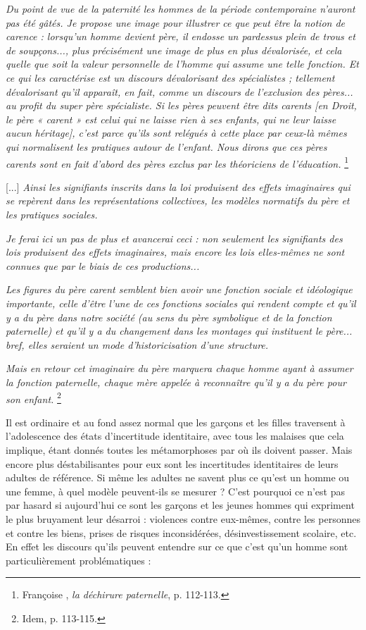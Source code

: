 \begin{displayquote} 
\emph{Du point de vue de la paternité les hommes de la période contemporaine n'auront pas été gâtés. Je propose une image pour illustrer ce que peut être la notion de carence : lorsqu'un homme devient père, il endosse un pardessus plein de trous et de soupçons..., plus précisément une image de plus en plus dévalorisée, et cela quelle que soit la valeur personnelle de l'homme qui assume une telle fonction. Et ce qui les caractérise est un discours dévalorisant des spécialistes ; tellement dévalorisant qu'il apparaît, en fait, comme un discours de l'exclusion des pères... au profit du super père spécialiste. Si les pères peuvent être dits carents \emph{[en Droit, le père « carent » est celui qui ne laisse rien à ses enfants, qui ne leur laisse aucun héritage]}, c'est parce qu'ils sont relégués à cette place par ceux-là mêmes qui normalisent les pratiques autour de l'enfant. Nous dirons que ces pères carents sont en fait d'abord des pères exclus par les théoriciens de l'éducation.}%
\footnote{Françoise , \emph{la déchirure paternelle}, p. 112-113.} 

[...] \emph{Ainsi les signifiants inscrits dans la loi produisent des effets imaginaires qui se repèrent dans les représentations collectives, les modèles normatifs du père et les pratiques sociales.} 

\emph{Je ferai ici un pas de plus et avancerai ceci : non seulement les signifiants des lois produisent des effets imaginaires, mais encore les lois elles-mêmes ne sont connues que par le biais de ces productions...}

\emph{Les figures du père carent semblent bien avoir une fonction sociale et idéologique importante, celle d'être l'une de ces fonctions sociales qui rendent compte et qu'il y a du père dans notre société (au sens du père symbolique et de la fonction paternelle) et qu'il y a du changement dans les montages qui instituent le père... bref, elles seraient un mode d'historicisation d'une structure.}

\emph{Mais en retour cet imaginaire du père marquera chaque homme ayant à assumer la fonction paternelle, chaque mère appelée à reconnaître qu'il y a du père pour son enfant.}%
\footnote{Idem, p. 113-115.}
\end{displayquote}

 Il est ordinaire et au fond assez normal que les garçons et les filles traversent à l'adolescence des états d'incertitude identitaire, avec tous les malaises que cela implique, étant donnés toutes les métamorphoses par où ils doivent passer. Mais encore plus déstabilisantes pour eux sont les incertitudes identitaires de leurs adultes de référence. Si même les adultes ne savent plus ce qu'est un homme ou une femme, à quel modèle peuvent-ils se mesurer ? C'est pourquoi ce n'est pas par hasard si aujourd'hui ce sont les garçons et les jeunes hommes qui expriment le plus bruyament leur désarroi : violences contre eux-mêmes, contre les personnes et contre les biens, prises de risques inconsidérées, désinvestissement scolaire, etc. En effet les discours qu'ils peuvent entendre sur ce que c'est qu'un homme sont particulièrement problématiques : 
 
